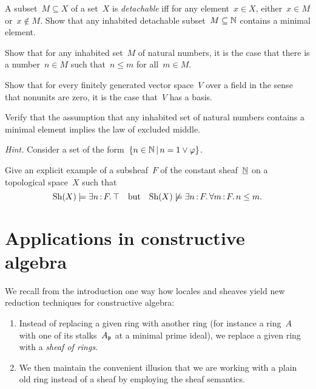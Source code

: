 \documentclass{ws-rv9x6}
\begin{document}
{\begin{exercise}%
\label{ex:least-number-principle}%
\begin{alphlist}[(e)]
\item A subset~$M \subseteq X$ of a set~$X$ is \emph{detachable} iff for any
element~$x \in X$, either~$x \in M$ or~$x \not\in M$. Show that any inhabited
detachable subset~$M \subseteq \mathbb{N}$ contains a minimal element.
\item Show that for any inhabited set~$M$ of natural numbers, it is \notnot the
case that there is a number~$n \in M$ such that~$n \leq m$ for all~$m \in M$.
\item Show that for every finitely generated vector space~$V$ over a field in the
sense that nonunits are zero, it is \notnot the case that~$V$ has a basis.
\item Verify that the assumption that any inhabited set of natural numbers
contains a minimal element implies the law of excluded middle.\smallskip

{\scriptsize\emph{Hint.} Consider a set of the form~$\{ n \in \mathbb{N} \,|\, n = 1
\vee \varphi \}$.\par}
\item Give an explicit example of a subsheaf~$F$ of the constant
sheaf~$\underline{\mathbb{N}}$ on a topological space~$X$ such that
\[ \mathrm{Sh}(X) \models \exists n\,{:}\,F\mathpunct{.} \top
  \quad\text{but}\quad
  \mathrm{Sh}(X) \not\models \exists n\,{:}\,F\mathpunct{.} \forall m\,{:}\,F\mathpunct{.} n \leq m. \]
\end{alphlist}
\end{exercise}



\section{Applications in constructive algebra}
\label{sect:appl}

We recall from the introduction one way how locales and sheaves yield new
reduction techniques for constructive algebra:
\begin{enumerate}
\item Instead of replacing a given ring with another ring (for instance a ring~$A$ with
one of its stalks~$A_{\mathfrak{p}}$ at a minimal prime ideal), we replace a given ring
with a \emph{sheaf of rings}.
\item We then maintain the convenient illusion that we are working with a plain old ring
instead of a sheaf by employing the sheaf semantics.
\end{enumerate}

}
\end{document}
